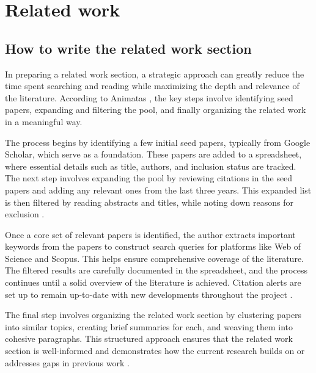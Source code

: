 \setcounter{chapter}{1}
\chapter{Related work} \label{relatedWork}

\section{How to write the related work section}
In preparing a related work section, a strategic approach can greatly reduce the time spent searching and reading while maximizing the depth and relevance of the literature. According to Animatas \cite{Animatas2023}, the key steps involve identifying seed papers, expanding and filtering the pool, and finally organizing the related work in a meaningful way.

The process begins by identifying a few initial seed papers, typically from Google Scholar, which serve as a foundation. These papers are added to a spreadsheet, where essential details such as title, authors, and inclusion status are tracked. The next step involves expanding the pool by reviewing citations in the seed papers and adding any relevant ones from the last three years. This expanded list is then filtered by reading abstracts and titles, while noting down reasons for exclusion \cite{Animatas2023}.

Once a core set of relevant papers is identified, the author extracts important keywords from the papers to construct search queries for platforms like Web of Science and Scopus. This helps ensure comprehensive coverage of the literature. The filtered results are carefully documented in the spreadsheet, and the process continues until a solid overview of the literature is achieved. Citation alerts are set up to remain up-to-date with new developments throughout the project \cite{Animatas2023}.

The final step involves organizing the related work section by clustering papers into similar topics, creating brief summaries for each, and weaving them into cohesive paragraphs. This structured approach ensures that the related work section is well-informed and demonstrates how the current research builds on or addresses gaps in previous work \cite{Animatas2023}.
